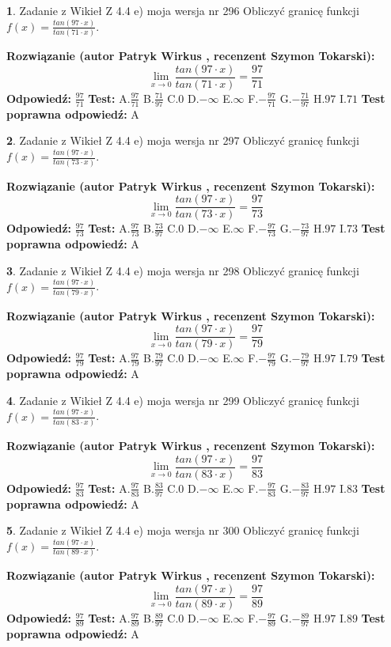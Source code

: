 \documentclass[12pt, a4paper]{article}
\theoremstyle{definition} %
\newtheorem{zad}{}
\newcommand{\zadStart}[1]{\begin{zad}#1\newline}
\newcommand{\zadStop}{\end{zad}}
\newcommand{\rozwStart}[2]{\noindent \textbf{Rozwiązanie (autor #1 , recenzent #2): }\newline}
\newcommand{\rozwStop}{\newline}
\newcommand{\odpStart}{\noindent \textbf{Odpowiedź:}\newline}
\newcommand{\odpStop}{\newline}
\newcommand{\testStart}{\noindent \textbf{Test:}\newline}
\newcommand{\testStop}{\newline}
\newcommand{\kluczStart}{\noindent \textbf{Test poprawna odpowiedź:}\newline}
\newcommand{\kluczStop}{\newline}
\begin{document}
\zadStart{Zadanie z Wikieł Z 4.4 e) moja wersja nr 296}
Obliczyć granicę funkcji $f(x)=\frac{tan(97\cdot x)}{tan(71\cdot x)}$.
\zadStop
\rozwStart{Patryk Wirkus}{Szymon Tokarski}
$$\lim\limits_{x\to 0}\frac{tan(97\cdot x)}{tan(71\cdot x)}=
\frac{97}{71}$$
\rozwStop
\odpStart
$\frac{97}{71}$
\odpStop
\testStart
A.$\frac{97}{71}$
B.$\frac{71}{97}$
C.$0$
D.$-\infty$
E.$\infty$
F.$-\frac{97}{71}$
G.$-\frac{71}{97}$
H.$97$
I.$71$
\testStop
\kluczStart
A
\kluczStop



\zadStart{Zadanie z Wikieł Z 4.4 e) moja wersja nr 297}
Obliczyć granicę funkcji $f(x)=\frac{tan(97\cdot x)}{tan(73\cdot x)}$.
\zadStop
\rozwStart{Patryk Wirkus}{Szymon Tokarski}
$$\lim\limits_{x\to 0}\frac{tan(97\cdot x)}{tan(73\cdot x)}=
\frac{97}{73}$$
\rozwStop
\odpStart
$\frac{97}{73}$
\odpStop
\testStart
A.$\frac{97}{73}$
B.$\frac{73}{97}$
C.$0$
D.$-\infty$
E.$\infty$
F.$-\frac{97}{73}$
G.$-\frac{73}{97}$
H.$97$
I.$73$
\testStop
\kluczStart
A
\kluczStop



\zadStart{Zadanie z Wikieł Z 4.4 e) moja wersja nr 298}
Obliczyć granicę funkcji $f(x)=\frac{tan(97\cdot x)}{tan(79\cdot x)}$.
\zadStop
\rozwStart{Patryk Wirkus}{Szymon Tokarski}
$$\lim\limits_{x\to 0}\frac{tan(97\cdot x)}{tan(79\cdot x)}=
\frac{97}{79}$$
\rozwStop
\odpStart
$\frac{97}{79}$
\odpStop
\testStart
A.$\frac{97}{79}$
B.$\frac{79}{97}$
C.$0$
D.$-\infty$
E.$\infty$
F.$-\frac{97}{79}$
G.$-\frac{79}{97}$
H.$97$
I.$79$
\testStop
\kluczStart
A
\kluczStop



\zadStart{Zadanie z Wikieł Z 4.4 e) moja wersja nr 299}
Obliczyć granicę funkcji $f(x)=\frac{tan(97\cdot x)}{tan(83\cdot x)}$.
\zadStop
\rozwStart{Patryk Wirkus}{Szymon Tokarski}
$$\lim\limits_{x\to 0}\frac{tan(97\cdot x)}{tan(83\cdot x)}=
\frac{97}{83}$$
\rozwStop
\odpStart
$\frac{97}{83}$
\odpStop
\testStart
A.$\frac{97}{83}$
B.$\frac{83}{97}$
C.$0$
D.$-\infty$
E.$\infty$
F.$-\frac{97}{83}$
G.$-\frac{83}{97}$
H.$97$
I.$83$
\testStop
\kluczStart
A
\kluczStop



\zadStart{Zadanie z Wikieł Z 4.4 e) moja wersja nr 300}
Obliczyć granicę funkcji $f(x)=\frac{tan(97\cdot x)}{tan(89\cdot x)}$.
\zadStop
\rozwStart{Patryk Wirkus}{Szymon Tokarski}
$$\lim\limits_{x\to 0}\frac{tan(97\cdot x)}{tan(89\cdot x)}=
\frac{97}{89}$$
\rozwStop
\odpStart
$\frac{97}{89}$
\odpStop
\testStart
A.$\frac{97}{89}$
B.$\frac{89}{97}$
C.$0$
D.$-\infty$
E.$\infty$
F.$-\frac{97}{89}$
G.$-\frac{89}{97}$
H.$97$
I.$89$
\testStop
\kluczStart
A
\kluczStop
\end{document}
